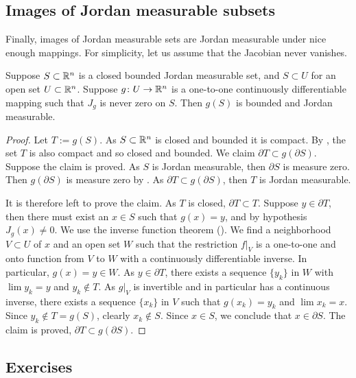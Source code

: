 \subsection{Images of Jordan measurable subsets}

Finally, images of Jordan measurable sets are Jordan measurable under
nice enough mappings.  For simplicity, let us assume that the Jacobian
never vanishes.

\begin{prop} \label{prop:imagejordanmeas}
Suppose $S \subset {\mathbb{R}}^n$ is a closed bounded Jordan measurable set,
and $S \subset U$ for an open set $U \subset {\mathbb{R}}^n$.
Suppose
$g \colon U \to {\mathbb{R}}^n$ is a one-to-one
continuously differentiable mapping such that
$J_g$ is never zero on $S$.
Then $g(S)$ is bounded and Jordan measurable.
\end{prop}

\begin{proof}
Let $T := g(S)$.  As $S \subset {\mathbb{R}}^n$ is closed and bounded it is compact.
By 
,
the set
$T$ is also compact and so closed and bounded.
We claim $\partial T \subset g(\partial S)$.  Suppose the claim is proved.
As $S$ is Jordan measurable, then
$\partial S$ is measure zero.  Then  $g(\partial S)$ is measure
zero by .  As $\partial T \subset g(\partial
S)$, then $T$ is Jordan measurable.

It is therefore left to prove the claim.
As $T$ is closed, $\partial T \subset T$.
Suppose $y \in \partial T$, then there must exist an
$x \in S$
such that $g(x) = y$, and by hypothesis $J_g(x) \not= 0$.
We use the inverse function theorem ().  We find 
a neighborhood $V \subset U$ of $x$ and an open set $W$ such that
the restriction $f|_V$ is a one-to-one and onto function from $V$ to $W$
with a continuously differentiable inverse.  In particular, $g(x) = y \in W$.
As $y \in \partial T$, there exists a sequence $\{ y_k \}$ in $W$ with
$\lim y_k = y$ and $y_k \notin T$.  As $g|_V$ is invertible and in
particular has a continuous inverse, there exists
a sequence $\{ x_k \}$ in $V$ such that $g(x_k) = y_k$ and $\lim x_k = x$.
Since $y_k \notin T = g(S)$, clearly $x_k \notin S$.  Since $x \in S$, we
conclude that $x \in \partial S$.  The claim is proved, $\partial T \subset
g(\partial S)$.
\end{proof}

\subsection{Exercises}

